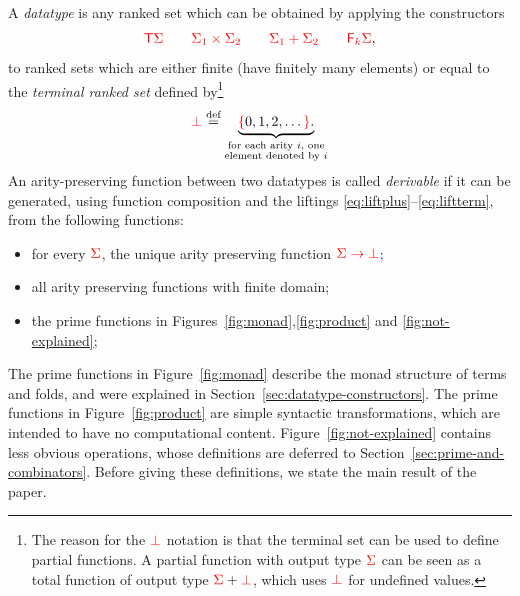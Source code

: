 \begin{definition}\label{def:derivable-function}
\label{def:types} 
    A \emph{datatype} is any ranked set which can be obtained by applying the constructors 
    \begin{align*}
    {\color{red}{{\color{red}{\mathsf T}}{\color{red}{\Sigma}}\qquad {\color{red}{\Sigma}}_1 \times{\color{red}{\Sigma}}_2 \qquad {\color{red}{\Sigma}}_1 + {\color{red}{\Sigma}}_2 \qquad {\color{red}{\mathsf F_{k}}}{\color{red}{\Sigma}}}},
    \end{align*}
    to ranked sets which are either finite (have finitely many elements) or equal to the \emph{terminal ranked set}  defined by\footnote{The reason for the ${\color{red}{\bot}}$ notation is that the terminal set can be used to define partial functions. A partial function with output  type  ${\color{red}{\Sigma}}$ can be seen as a total function of output type ${\color{red}{\Sigma}} + {\color{red}{\bot}}$, which uses  ${\color{red}{\bot}}$  for  undefined values.
    }
    \begin{align*}
    {\color{red}{\bot}} \stackrel{\text{def}}=  \underbrace{{\color{red}{\{}}0, 1, 2,\ldots {\color{red}{\}}}.}_{\substack{\text{for each arity $i$, one} \\ \text{element denoted by $i$}}}
    \end{align*}  
    An arity-preserving function between two datatypes is called \emph{derivable}  if it can be generated, using function composition and the liftings 
    \eqref{eq:liftplus}--\eqref{eq:liftterm}, from the following functions:
    \begin{itemize}
    \item for every ${\color{red}{\Sigma}}$, the unique arity preserving function ${\color{red}{\Sigma \to {\color{red}{\bot}}}}$;
    \item  all arity preserving functions with finite domain;
        \item  the prime functions in Figures~\ref{fig:monad},\ref{fig:product} and \ref{fig:not-explained};
         \end{itemize}
  

   
\end{definition}



%

The prime functions in Figure~\ref{fig:monad} describe the monad structure of terms and folds, and were explained in Section~\ref{sec:datatype-constructors}. The prime functions in Figure~\ref{fig:product} are  simple syntactic transformations, which are intended to have no computational content.  Figure~\ref{fig:not-explained} contains   less obvious operations, whose definitions are  deferred to Section~\ref{sec:prime-and-combinators}. Before giving these definitions, we state the main result of the paper. 

